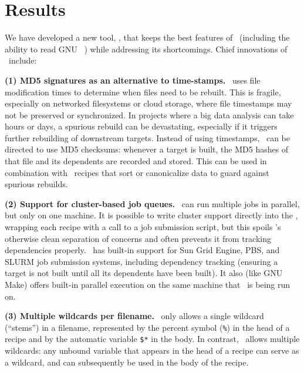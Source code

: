 \section*{Results}

We have developed a new tool, \biomake, that keeps the best features of \make\ (including the ability to read  GNU \Makefile\ ) while addressing its shortcomings.
Chief innovations of \biomake\ include:

{\bf (1) MD5 signatures as an alternative to time-stamps.}
\make\ uses file modification times to determine when files need to be rebuilt.
This is fragile, especially on networked filesystems or cloud storage, where file timestamps may not be preserved or synchronized.
In projects where a big data analysis can take hours or days, a spurious rebuild can be devastating, especially if it triggers further rebuilding of downstream targets.
Instead of using timestamps, \biomake\ can be directed to use MD5 checksums: whenever a target is built, the MD5 hashes of that file and its dependents are recorded
and stored. This can be used in combination with \Makefile\ recipes that sort or canonicalize data to guard against spurious rebuilds.

{\bf (2) Support for cluster-based job queues.}
\make\ can run multiple jobs in parallel, but only on one machine.
It is possible to write cluster support directly into the \Makefile,
wrapping each recipe with a call to a job submission script,
but this spoils \make's otherwise clean separation of concerns
and often prevents it from tracking dependencies properly.
\biomake\ has built-in support for Sun Grid Engine, PBS, and SLURM job submission systems,
including dependency tracking (ensuring a target is not built until all its dependents have been built).
It also (like GNU Make) offers built-in parallel execution on
the same machine that \biomake\ is being run on.

{\bf (3) Multiple wildcards per filename.}
\make\ only allows a single wildcard (``stems'') in a filename,
represented by the percent symbol ({\tt \%}) in the head of a recipe and by the automatic variable {\tt \$*} in the body.
In contrast, \biomake\ allows multiple wildcards: any unbound variable that appears in the head of a recipe can serve as a wildcard,
and can subsequently be used in the body of the recipe.



